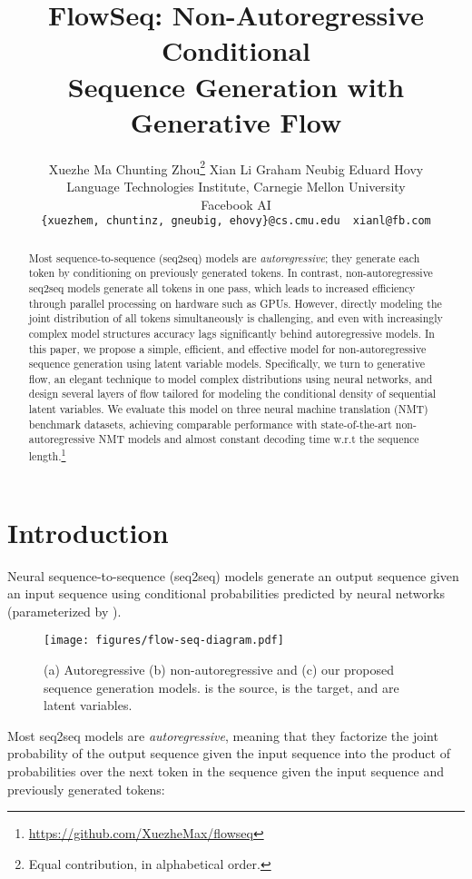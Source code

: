 \documentclass[11pt,a4paper]{article}
\title{FlowSeq:  Non-Autoregressive Conditional \\ Sequence Generation with Generative Flow}
\author{Xuezhe Ma  Chunting Zhou\thanks{ Equal contribution, in alphabetical order.}  Xian Li  Graham Neubig  Eduard Hovy \\
  Language Technologies Institute, Carnegie Mellon University \\ Facebook AI \\
     {\tt \{xuezhem, chuntinz, gneubig, ehovy\}@cs.cmu.edu ~xianl@fb.com} \\
}
\date{}
\begin{document}
\maketitle
\begin{abstract}
Most sequence-to-sequence (seq2seq) models are \emph{autoregressive}; they generate each token by conditioning on previously generated tokens.
In contrast, non-autoregressive seq2seq models generate all tokens in one pass, which leads to increased efficiency through parallel processing on hardware such as GPUs. 
However, directly modeling the joint distribution of all tokens simultaneously is challenging, and even with increasingly complex model structures accuracy lags significantly behind autoregressive models.
In this paper, we propose a simple, efficient, and effective model for non-autoregressive sequence generation using latent variable models.
Specifically, we turn to generative flow, an elegant technique to model complex distributions using neural networks, and design several layers of flow tailored for modeling the conditional density of sequential latent variables.
We evaluate this model on three neural machine translation (NMT) benchmark datasets, achieving comparable performance with state-of-the-art non-autoregressive NMT models and almost constant decoding time w.r.t the sequence length.\footnote{\url{https://github.com/XuezheMax/flowseq}}
\end{abstract}

\section{Introduction}

Neural sequence-to-sequence (seq2seq) models \citep{bahdanau2014neural,rush2015neural,vinyals2015show,vaswani2017attention} generate an output sequence  given an input sequence  using conditional probabilities  predicted by neural networks (parameterized by ).

\begin{figure}[tb]
  \centering
  \texttt{[image: figures/flow-seq-diagram.pdf]}
  \caption{(a) Autoregressive (b) non-autoregressive and (c) our proposed sequence generation models.  is the source,  is the target, and  are latent variables.} \label{fig:diagram}
  \vspace{-4mm}
\end{figure}

Most seq2seq models are \emph{autoregressive}, meaning that they factorize the joint probability of the output sequence given the input sequence  into the product of probabilities over the next token in the sequence given the input sequence and previously generated tokens:
\end{document}
